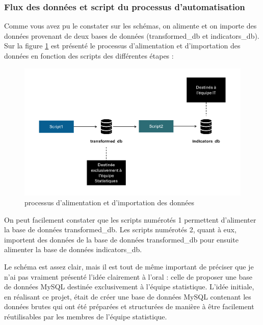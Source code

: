 \documentclass[12pt]{article}
\begin{document}
\subsubsection{Flux des données et script du processus d'automatisation}

Comme vous avez pu le constater sur les schémas, on alimente et on importe des 
données provenant de deux bases de données (transformed\_db et indicators\_db). 
Sur la figure \ref{fig:prc} est présenté le processus d'alimentation 
et d'importation des données en fonction des scripts des différentes étapes :

\begin{figure}[H]
    \centering
    \includegraphics[width=\textwidth]{schema_alim_base.png}
    \caption{ processus d'alimentation et 
    d'importation des données}
    \label{fig:prc}
\end{figure}

On peut facilement constater que les scripts numérotés 1 permettent d'alimenter 
la base de données transformed\_db. Les scripts numérotés 2, quant à eux, importent 
des données de la base de données transformed\_db pour ensuite alimenter la base de données 
indicators\_db.\newline

Le schéma est assez clair, mais il est tout de même important de préciser que 
je n'ai pas vraiment présenté l'idée clairement à l'oral : celle de proposer 
une base de données MySQL destinée exclusivement à l'équipe statistique. 
L'idée initiale, en réalisant ce projet, était de créer une base de données 
MySQL contenant les données brutes qui ont été préparées et structurées de 
manière à être facilement réutilisables par les membres de l'équipe statistique.\newline
\end{document}
